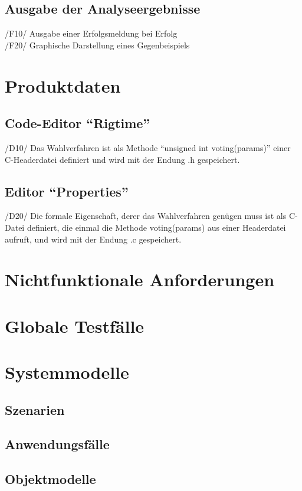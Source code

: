 \documentclass[a4paper]{scrreprt}
\begin{document}
\section{Ausgabe der Analyseergebnisse}
/F10/ Ausgabe einer Erfolgsmeldung bei Erfolg \\
/F20/ Graphische Darstellung eines Gegenbeispiels \\

\chapter{Produktdaten}
\section{Code-Editor "`Rigtime"'}
/D10/ Das Wahlverfahren ist als Methode "`unsigned int voting(params)"' einer C-Headerdatei definiert und wird mit der Endung .h gespeichert.

\section{Editor "`Properties"'}
/D20/ Die formale Eigenschaft, derer das Wahlverfahren genügen muss ist als C-Datei definiert, die einmal die Methode voting(params) aus einer Headerdatei aufruft, und wird mit der Endung .c gespeichert.


\chapter{Nichtfunktionale Anforderungen}


\chapter{Globale Testfälle}


\chapter{Systemmodelle}
\section{Szenarien}
\section{Anwendungsfälle}
\section{Objektmodelle}
\end{document}
